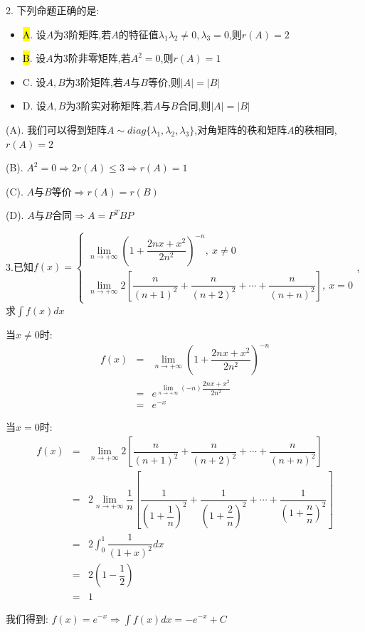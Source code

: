 2. 下列命题正确的是:  
\begin{itemize}
	\item \hl{A}. 设$A$为$3$阶矩阵,若$A$的特征值$\lambda_{1}\lambda_{2}\neq 0,\lambda_{3}=0$,则$r(A)=2$
	\item \hl{B}. 设$A$为$3$阶非零矩阵,若$A^2=0$,则$r(A)=1$
	\item C. 设$A,B$为$3$阶矩阵,若$A$与$B$等价,则$|A|=|B|$
	\item D. 设$A,B$为$3$阶实对称矩阵,若$A$与$B$合同,则$|A|=|B|$
\end{itemize}
\begin{solution}

	(A). 我们可以得到矩阵$A\sim diag\{\lambda_{1},\lambda_{2},\lambda_{3}\}$,对角矩阵的秩和矩阵$A$的秩相同,$r(A)=2$
	
	(B). $A^2=0\Rightarrow 2r(A)\leq 3\Rightarrow r(A)=1$
	
	(C). $A$与$B$等价$\Rightarrow r(A)=r(B)$
	
	(D). $A$与$B$合同$\Rightarrow A=P^{T}BP$
\end{solution}

3.已知$f(x)=\left\lbrace
\begin{array}{l}
	\lim\limits_{n\rightarrow +\infty}\left( 1+\dfrac{2nx+x^2}{2n^2}\right)^{-n},\ x\neq 0\\
	\lim\limits_{n\rightarrow +\infty}2\left[ \dfrac{n}{(n+1)^2}+\dfrac{n}{(n+2)^2}+\cdots+\dfrac{n}{(n+n)^2}\right],\ x=0  
\end{array}
\right. $,求$\int f(x)dx$
\begin{solution}

	当$x\neq 0$时:  
	\begin{eqnarray*}
		f(x)&=&\lim\limits_{n\rightarrow +\infty}\left( 1+\dfrac{2nx+x^2}{2n^2}\right)^{-n}\\
		&=&e^{\lim\limits_{n\rightarrow +\infty}(-n)\dfrac{2nx+x^2}{2n^2}}\\
		&=&e^{-x}
	\end{eqnarray*}

	当$x=0$时:  
	\begin{eqnarray*}
		f(x)&=&\lim\limits_{n\rightarrow +\infty}2\left[ \dfrac{n}{(n+1)^2}+\dfrac{n}{(n+2)^2}+\cdots+\dfrac{n}{(n+n)^2}\right]\\
		&=&2\lim\limits_{n\rightarrow +\infty}\dfrac{1}{n}\left[ \dfrac{1}{(1+\dfrac{1}{n})^2}+\dfrac{1}{(1+\dfrac{2}{n})^2}+\cdots+\dfrac{1}{(1+\dfrac{n}{n})^2}\right]\\
		&=&2\int_{0}^{1}\dfrac{1}{(1+x)^2}dx\\
		&=&2(1-\dfrac{1}{2})\\
		&=&1
	\end{eqnarray*}

	我们得到:  $f(x)=e^{-x}\Rightarrow \int f(x)dx=-e^{-x}+C$
\end{solution}


